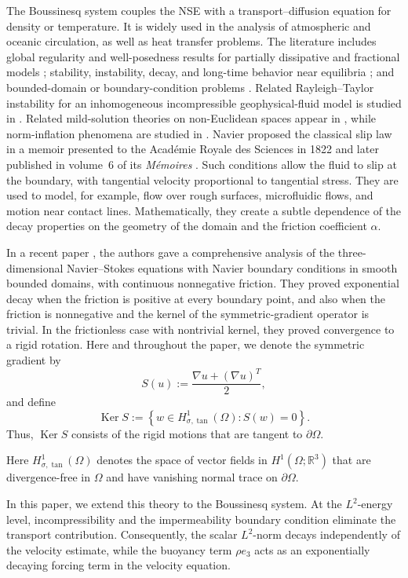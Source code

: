 \documentclass[11pt,reqno]{amsart}
\theoremstyle{plain}
\numberwithin{equation}{section}
\DeclareMathOperator{\kernel}{Ker}
\begin{document}
The Boussinesq system couples the NSE with a transport--diffusion equation for density or temperature. It is widely used in the analysis of atmospheric and oceanic circulation, as well as heat transfer problems. The literature includes global regularity and well-posedness results for partially dissipative and fractional models \cite{KW2,W1,stefanov1,stefanov2,WJ3,WJ4}; stability, instability, decay, and long-time behavior near equilibria \cite{D1,D2,KW1,WJ2,WJ6,WJ7,WJ8}; and bounded-domain or boundary-condition problems \cite{di,ragusa,W3,WJ5,HuEtAl2018,BleitnerCarlsonNobili2025}. {Related Rayleigh--Taylor instability for an inhomogeneous incompressible geophysical-fluid model is studied in \cite{han1}.} Related mild-solution theories on non-Euclidean spaces appear in \cite{pham1,xuan}, while norm-inflation phenomena are studied in \cite{W2}. Navier proposed the classical slip law in a memoir presented to the Acad\'emie Royale des Sciences in 1822 and later published in volume~6 of its \emph{M\'emoires} \cite{navier}. Such conditions allow the fluid to slip at the boundary, with tangential velocity proportional to tangential stress. They are used to model, for example, flow over rough surfaces, microfluidic flows, and motion near contact lines. Mathematically, they create a subtle dependence of the decay properties on the geometry of the domain and the friction coefficient $\alpha$.

In a recent paper \cite{Kelliher2025}, the authors gave a comprehensive analysis of the three-dimensional Navier--Stokes equations with Navier boundary conditions in smooth bounded domains, with continuous nonnegative friction. They proved exponential decay when the friction is positive at every boundary point, and also when the friction is nonnegative and the kernel of the symmetric-gradient operator is trivial. In the frictionless case with nontrivial kernel, they proved convergence to a rigid rotation. Here and throughout the paper, we denote the symmetric gradient by
\[
S(u):=\frac{\nabla u+(\nabla u)^T}{2},
\]
and define
\[
\kernel S
:=
\left\{
w\in H^1_{\sigma,\tan}(\Omega):S(w)=0
\right\}.
\]
Thus, $\kernel S$ consists of the rigid motions that are tangent to
$\partial\Omega$.

Here $H^1_{\sigma,\tan}(\Omega)$ denotes the space of vector fields in
$H^1(\Omega;\mathbb R^3)$ that are divergence-free in $\Omega$ and have
vanishing normal trace on $\partial\Omega$.


In this paper, we extend this theory to the Boussinesq system. At the $L^2$-energy level, incompressibility and the impermeability boundary condition eliminate the transport contribution. Consequently, the scalar $L^2$-norm decays independently of the velocity estimate, while the buoyancy term $\rho e_3$ acts as an exponentially decaying forcing term in the velocity equation.
\end{document}
